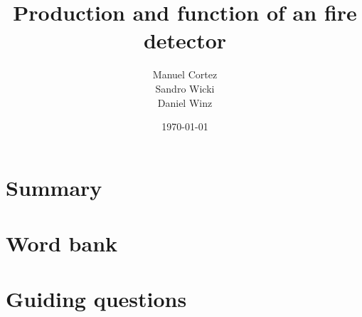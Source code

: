 \documentclass[a4paper]{article}
\title{Production and function of an fire detector}
\author{Manuel Cortez\\Sandro Wicki\\Daniel Winz}
\date{\today}
\begin{document}
\maketitle

\section{Summary}


\section{Word bank}


\section{Guiding questions}


\nocite{*}

\end{document}
